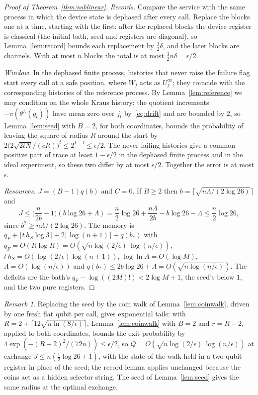 \documentclass[11pt,a4paper]{article}
\theoremstyle{plain}
\theoremstyle{definition}
\theoremstyle{remark}
\newtheorem{remark}[theorem]{Remark}
\begin{document}
\begin{proof}[Proof of Theorem~\ref{thm:sublinear}]
\emph{Records.} Compare the service with the same process in which the device state is dephased after every call. Replace
the blocks one at a time, starting with the first: after the replaced blocks the device register is classical (the
initial bath, seed and registers are diagonal), so Lemma~\ref{lem:record} bounds each replacement by $\frac32\delta$, and the
later blocks are channels. With at most $n$ blocks the total is at most $\frac32n\delta=\epsilon/2$.

\emph{Window.} In the dephased finite process, histories that never raise the failure flag start every call at a safe
position, where $W_j$ acts as $U_j^\infty$; they coincide with the corresponding histories of the reference process. By
Lemma~\ref{lem:reference} we may condition on the whole Kraus history; the quotient increments $-\pi(\theta^{j_t}(g_t))$ have mean
zero over $j_t$ by~\eqref{eq:drift} and are bounded by $2$, so Lemma~\ref{lem:seed} with $B=2$, for both coordinates, bounds the probability
of leaving the square of radius $R$ around the start by $2\big(2\sqrt{2tN}/(cR)\big)^t\le2^{1-t}\le\epsilon/2$. The never-failing
histories give a common positive part of trace at least $1-\epsilon/2$ in the dephased finite process and in the ideal
experiment, so these two differ by at most $\epsilon/2$. Together the error is at most $\epsilon$.

\emph{Resources.} $J=(B-1)q(b)$ and $C=0$. If $B\ge2$ then $b=\lceil\sqrt{n\Lambda/(2\log26)}\rceil$ and
\[
J\le\Big(\frac n{2b}-1\Big)(b\log26+\Lambda)=\frac n2\log26+\frac{n\Lambda}{2b}-b\log26-\Lambda\le\frac n2\log26,
\]
since $b^2\ge n\Lambda/(2\log26)$. The memory is $q_F+\lceil t\,h_S\log3\rceil+2\lceil\log(n+1)\rceil+q(b_*)$ with
$q_F=O(R\log R)=O(\sqrt{n\log(2/\epsilon)}\,\log(n/\epsilon))$, $t\,h_S=O(\log(2/\epsilon)\log(n+1))$, $\log\ln A=O(\log M)$,
$\Lambda=O(\log(n/\epsilon))$ and $q(b_*)\le2b\log26+\Lambda=O(\sqrt{n\log(n/\epsilon)})$.
The deficits are the bath's $q_F-\log((2M)!)<2\log M+1$, the seed's below $1$, and the two pure registers.
\end{proof}

\begin{remark}\label{rem:variants}
Replacing the seed by the coin walk of Lemma~\ref{lem:coinwalk}, driven by one fresh flat qubit per call, gives exponential
tails: with $R=2+\lceil12\sqrt{n\ln(8/\epsilon)}\rceil$, Lemma~\ref{lem:coinwalk} with $B=2$ and $r=R-2$, applied to both
coordinates, bounds the exit probability by $4\exp(-(R-2)^2/(72n))\le\epsilon/2$, so
$Q=O(\sqrt{n\log(2/\epsilon)}\,\log(n/\epsilon))$ at exchange $J\le n(\frac12\log26+1)$, with the state of the walk held in a
two-qubit register in place of the seed; the record lemma applies unchanged because the coins act as a hidden selector string. The seed of Lemma~\ref{lem:seed} gives the same radius at the optimal exchange.
\end{remark}
\end{document}
